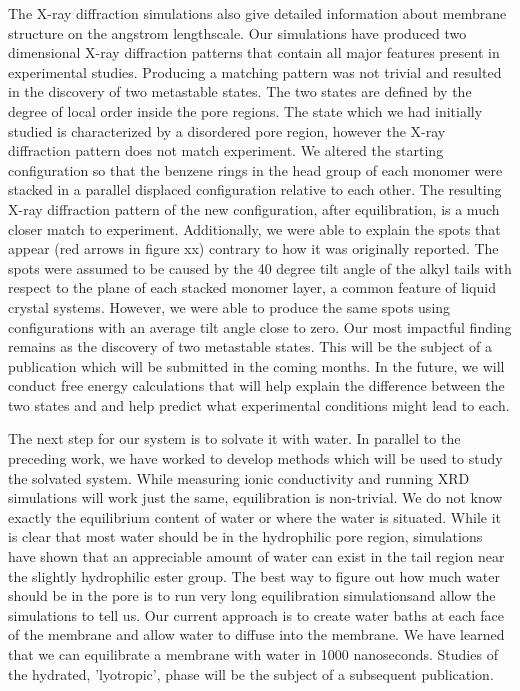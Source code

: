 The X-ray diffraction simulations also give detailed information
about membrane structure on the angstrom lengthscale. Our simulations
have produced two dimensional X-ray diffraction patterns that 
contain all major features present in experimental studies. Producing
a matching pattern was not trivial and resulted in the discovery of
two metastable states. The two states are defined by the degree of 
local order inside the pore regions. The state which we had initially
studied is characterized by a disordered pore region, however the X-ray
diffraction pattern does not match experiment. We altered the starting 
configuration so that the benzene rings in the head group of each
monomer were stacked in a parallel displaced configuration relative
to each other. The resulting X-ray diffraction pattern of the new
configuration, after equilibration, is a much closer match to experiment.
Additionally, we were able to explain the spots that appear (red arrows
in figure xx) contrary to how it was originally reported. The spots 
were assumed to be caused by the 40 degree tilt angle of the alkyl
tails with respect to the plane of each stacked monomer layer, a 
common feature of liquid crystal systems. However, we were able to 
produce the same spots using configurations with an average tilt angle
close to zero. Our most impactful finding remains as the discovery of 
two metastable states. This will be the subject of a publication which 
will be submitted in the coming months. In the future, we will conduct
free energy calculations that will help explain the difference between
the two states and and help predict what experimental conditions might
lead to each. 

The next step for our system is to solvate it with water. In parallel 
to the preceding work, we have worked to develop methods which will be
used to study the solvated system. While measuring ionic conductivity 
and running XRD simulations will work just the same, equilibration is 
non-trivial. We do not know exactly the equilibrium content of water 
or where the water is situated. While it is clear that most water should be in the hydrophilic pore region, simulations have shown that an 
appreciable amount of water can exist in the tail region near the 
slightly hydrophilic ester group. The best way to figure out how much 
water should be in the pore is to run very long equilibration simulationsand allow the simulations to tell us. Our current approach is to create
water baths at each face of the membrane and allow water to diffuse into
the membrane. We have learned that we can equilibrate a membrane with
water in 1000 nanoseconds. Studies of the hydrated, 'lyotropic', phase
will be the subject of a subsequent publication.

